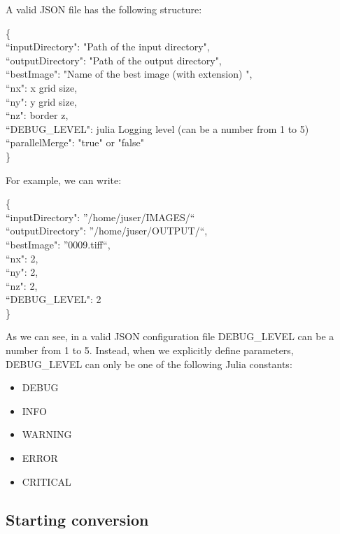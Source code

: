\documentclass[11pt,oneside]{article}	%
\begin{document}
A valid JSON file has the following structure:
\begin{tabbing}
\{ \= \\
\>  ``inputDirectory": "Path of the input directory",\\
\>  ``outputDirectory": "Path of the output directory",\\
\>  ``bestImage": "Name of the best image (with extension) ",\\
\>  ``nx": x grid size,\\
\>  ``ny": y grid size,\\
\>  ``nz": border z,\\
\>  ``DEBUG\_LEVEL": julia Logging level (can be a number from 1 to 5)\\
\>  ``parallelMerge": "true" or "false" \\
\}\\
\end{tabbing}

For example, we can write:

\begin{tabbing}
\{ \= \\
\>  ``inputDirectory": ''/home/juser/IMAGES/``\\
\>  ``outputDirectory": ''/home/juser/OUTPUT/``,\\
\>  ``bestImage": ''0009.tiff``,\\
\>  ``nx": 2,\\
\>  ``ny": 2,\\
\>  ``nz": 2,\\
\>  ``DEBUG\_LEVEL": 2\\
\}\\
\end{tabbing}

As we can see, in a valid JSON configuration file DEBUG\_LEVEL can be a number from 1 to 5. Instead, when we explicitly define parameters, DEBUG\_LEVEL can only be one of the following Julia constants:

\begin{itemize}
 \item DEBUG
 \item INFO
 \item WARNING
 \item ERROR
 \item CRITICAL
\end{itemize}

\subsection{Starting conversion}\label{sec:input}
\end{document}
